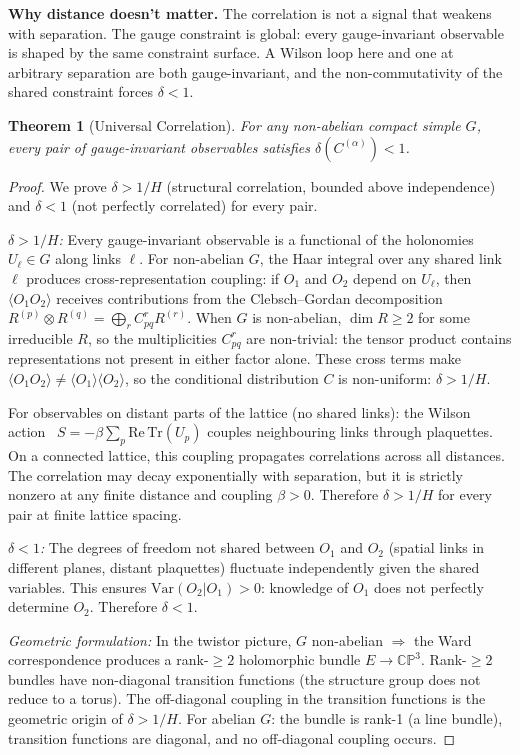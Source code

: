 \documentclass[11pt,a4paper]{article}
\newtheorem{theorem}{Theorem}[section]
\theoremstyle{definition}
\theoremstyle{remark}
\newcommand{\CP}{\mathbb{CP}}
\newcommand{\Tr}{\mathrm{Tr}}
\begin{document}
\textbf{Why distance doesn't matter.} The correlation is not a signal that weakens with separation. The gauge constraint is global: every gauge-invariant observable is shaped by the same constraint surface. A Wilson loop here and one at arbitrary separation are both gauge-invariant, and the non-commutativity of the shared constraint forces $\delta<1$.

\begin{theorem}[Universal Correlation]\label{thm:universal}
For any non-abelian compact simple $G$, every pair of gauge-invariant observables satisfies $\delta(C^{(\alpha)})<1$.
\end{theorem}

\begin{proof}
We prove $\delta>1/H$ (structural correlation, bounded above independence) and $\delta<1$ (not perfectly correlated) for every pair.

\emph{$\delta>1/H$:} Every gauge-invariant observable is a functional of the holonomies $U_\ell\in G$ along links $\ell$. For non-abelian $G$, the Haar integral over any shared link $\ell$ produces cross-representation coupling: if $O_1$ and $O_2$ depend on $U_\ell$, then $\langle O_1 O_2\rangle$ receives contributions from the Clebsch--Gordan decomposition $R^{(p)}\otimes R^{(q)}=\bigoplus_r C^r_{pq}R^{(r)}$. When $G$ is non-abelian, $\dim R\geq 2$ for some irreducible $R$, so the multiplicities $C^r_{pq}$ are non-trivial: the tensor product contains representations not present in either factor alone. These cross terms make $\langle O_1 O_2\rangle\neq\langle O_1\rangle\langle O_2\rangle$, so the conditional distribution $C$ is non-uniform: $\delta>1/H$.

For observables on distant parts of the lattice (no shared links): the Wilson action~\cite{Wilson1974} $S=-\beta\sum_p\mathrm{Re}\,\Tr(U_p)$ couples neighbouring links through plaquettes. On a connected lattice, this coupling propagates correlations across all distances. The correlation may decay exponentially with separation, but it is strictly nonzero at any finite distance and coupling $\beta>0$. Therefore $\delta>1/H$ for every pair at finite lattice spacing.

\emph{$\delta<1$:} The degrees of freedom not shared between $O_1$ and $O_2$ (spatial links in different planes, distant plaquettes) fluctuate independently given the shared variables. This ensures $\mathrm{Var}(O_2|O_1)>0$: knowledge of $O_1$ does not perfectly determine $O_2$. Therefore $\delta<1$.

\emph{Geometric formulation:} In the twistor picture, $G$ non-abelian $\Rightarrow$ the Ward correspondence produces a rank-$\geq 2$ holomorphic bundle $E\to\CP^3$. Rank-$\geq 2$ bundles have non-diagonal transition functions (the structure group does not reduce to a torus). The off-diagonal coupling in the transition functions is the geometric origin of $\delta>1/H$. For abelian $G$: the bundle is rank-1 (a line bundle), transition functions are diagonal, and no off-diagonal coupling occurs.
\end{proof}
\end{document}
